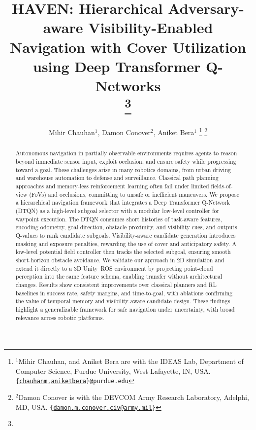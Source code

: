 \documentclass[letterpaper, 10 pt, conference]{ieeeconf}
\begin{document}
\title{HAVEN: Hierarchical Adversary-aware Visibility-Enabled Navigation with Cover Utilization using Deep Transformer Q-Networks\\
\thanks{}
}

\author{Mihir Chauhan$^{1}$, Damon Conover$^{2}$, Aniket Bera$^{1}$%
\thanks{\raggedright $^{1}$Mihir Chauhan, and Aniket Bera are with the IDEAS Lab, Department of Computer Science, Purdue University, West Lafayette, IN, USA. %
        {\tt\small \{\href{mailto:chauhanm@purdue.edu}{chauhanm}\allowbreak,\href{mailto:aniketbera@purdue.edu}{aniketbera}\allowbreak\}@\allowbreak purdue\allowbreak.edu}}
\thanks{\raggedright $^{2}$Damon Conover is with the DEVCOM Army Research Laboratory, Adelphi, MD, USA. %
        {\tt\small \{\href{mailto:chauhanm@purdue.edu}{damon.m.conover.civ@army.mil}\}}}%
}

\maketitle

\begin{abstract}
Autonomous navigation in partially observable environments requires agents to reason beyond immediate sensor input, exploit occlusion, and ensure safety while progressing toward a goal. These challenges arise in many robotics domains, from urban driving and warehouse automation to defense and surveillance. Classical path planning approaches and memory-less reinforcement learning often fail under limited fields-of-view (FoVs) and occlusions, committing to unsafe or inefficient maneuvers. We propose a hierarchical navigation framework that integrates a Deep Transformer Q-Network (DTQN) as a high-level subgoal selector with a modular low-level controller for waypoint execution. The DTQN consumes short histories of task-aware features, encoding odometry, goal direction, obstacle proximity, and visibility cues, and outputs Q-values to rank candidate subgoals. Visibility-aware candidate generation introduces masking and exposure penalties, rewarding the use of cover and anticipatory safety. A low-level potential field controller then tracks the selected subgoal, ensuring smooth short-horizon obstacle avoidance. We validate our approach in 2D simulation and extend it directly to a 3D Unity–ROS environment by projecting point-cloud perception into the same feature schema, enabling transfer without architectural changes. Results show consistent improvements over classical planners and RL baselines in success rate, safety margins, and time-to-goal, with ablations confirming the value of temporal memory and visibility-aware candidate design. These findings highlight a generalizable framework for safe navigation under uncertainty, with broad relevance across robotic platforms.
\end{abstract}
\end{document}
